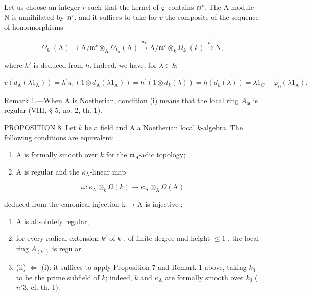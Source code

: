 Let us choose an integer \(r\) such that the kernel of \(\varphi\) contains \(\mathfrak{m}^r\). The A-module N is annihilated by \(\mathfrak{m}^r\), and it suffices to take for \(v\) the composite of the sequence of homomorphisms

\[
\Omega_ {k _ {0}} (\mathrm{A}) \longrightarrow \mathrm{A} / \mathfrak {m} ^ {r} \otimes_ {\mathrm{A}} \Omega_ {k _ {0}} (\mathrm{A}) \xrightarrow {u _ {r}} \mathrm{A} / \mathfrak {m} ^ {r} \otimes_ {k} \Omega_ {k _ {0}} (k) \xrightarrow {h ^ {\prime}} \mathrm{N},
\]

where \(h'\) is deduced from \(h\). Indeed, we have, for \(\lambda \in k\):

\[
v \left(d _ {\mathrm{A}} \left(\lambda 1 _ {\mathrm{A}}\right)\right) = h ^ {\prime} u _ {r} \left(1 \otimes d _ {\mathrm{A}} \left(\lambda 1 _ {\mathrm{A}}\right)\right) = h ^ {\prime} \left(1 \otimes d _ {k} (\lambda)\right) = h \left(d _ {k} (\lambda)\right) = \lambda 1 _ {\mathrm{C}} - \tilde {\varphi} _ {0} \left(\lambda 1 _ {\mathrm{A}}\right).
\]

Remark 1.—When A is Noetherian, condition (i) means that the local ring \(A_{\mathfrak{m}}\) is regular (VIII, § 5, no. 2, th. 1).

PROPOSITION 8. Let \(k\) be a field and A a Noetherian local \(k\)-algebra. The following conditions are equivalent:

\begin{enumerate}
\def\labelenumi{(\roman{enumi})}
\item
  A is formally smooth over \(k\) for the \(\mathfrak{m}_{A}\)-adic topology;
\item
  A is regular and the \(\kappa_{\mathrm{A}}\)-linear map
\end{enumerate}

\[
\omega : \kappa_ {\mathrm{A}} \otimes_ {k} \Omega (k) \longrightarrow \kappa_ {\mathrm{A}} \otimes_ {\mathrm{A}} \Omega (\mathrm{A})
\]

deduced from the canonical injection k → A is injective ;

\begin{enumerate}
\def\labelenumi{(\roman{enumi})}
\setcounter{enumi}{2}
\item
  A is absolutely regular;
\item
  for every radical extension \(k'\) of \(k\) , of finite degree and height \(\leqslant 1\) , the local ring \(A_{(k')}\) is regular.
\item
  (ii) \(\Leftrightarrow\) (i): it suffices to apply Proposition 7 and Remark 1 above, taking \(k_{0}\) to be the prime subfield of \(k\); indeed, \(k\) and \(\kappa_{\mathrm{A}}\) are formally smooth over \(k_{0}\) (\(n^{\circ}3\), cf. th. 1).
\end{enumerate}

